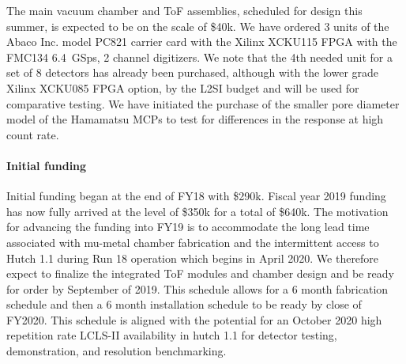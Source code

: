 \documentclass[aps]{revtex4}
\begin{document}







The main vacuum chamber and ToF assemblies, scheduled for design this summer, is expected to be on the scale of \$40k. %
We have ordered 3 units of the Abaco Inc. model PC821 carrier card with the Xilinx XCKU115 FPGA with the FMC134 6.4~GSps, 2 channel digitizers.
We note that the 4th needed unit for a set of 8 detectors has already been purchased, although with the lower grade Xilinx XCKU085 FPGA option, by the L2SI budget and will be used for comparative testing.
We have initiated the purchase of the smaller pore diameter model of the Hamamatsu MCPs to test for differences in the response at high count rate.


\paragraph*{Initial funding}
Initial funding began at the end of FY18 with \$290k.  
Fiscal year 2019 funding has now fully arrived at the level of \$350k for a total of \$640k. 
The motivation for advancing the funding into FY19 is to accommodate the long lead time associated with mu-metal chamber fabrication and the intermittent access to Hutch 1.1 during Run 18 operation which begins in April 2020.
We therefore expect to finalize the integrated ToF modules and chamber design and be ready for order by September of 2019.  
This schedule allows for a 6 month fabrication schedule and then a 6 month installation schedule to be ready by close of FY2020.
This schedule is aligned with the potential for an October 2020 high repetition rate LCLS-II availability in hutch 1.1 for detector testing, demonstration, and resolution benchmarking.
\end{document}
